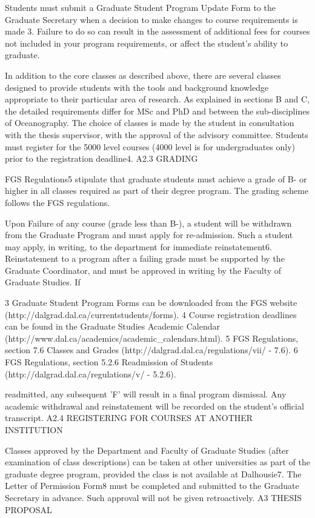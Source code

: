 Students must submit a Graduate Student Program Update Form to the Graduate Secretary when a decision to make changes to course requirements is made 3. Failure to do so can result in the assessment of additional fees for courses not included in your program requirements, or affect the student’s ability to graduate.

In addition to the core classes as described above, there are several classes designed to provide students with the tools and background knowledge appropriate to their particular area of research. As explained in sections B and C, the detailed requirements differ for MSc and PhD and between the sub-disciplines of Oceanography. The choice of classes is made by the student in consultation with the thesis supervisor, with the approval of the advisory committee. Students must register for the 5000 level
courses (4000 level is for undergraduates only) prior to the registration deadline4.
A2.3	GRADING

FGS Regulations5 stipulate that graduate students must achieve a grade of B- or higher in all classes required as part of their degree program.  The grading scheme follows the FGS regulations.

Upon Failure of any course (grade less than B-), a student will be withdrawn from the Graduate Program and must apply for re-admission. Such a student may apply, in writing, to the department for immediate reinstatement6. Reinstatement to a program after a failing grade must be supported by the Graduate Coordinator, and must be approved in writing by the Faculty of Graduate Studies. If

3 Graduate Student Program Forms can be downloaded from the FGS website (http://dalgrad.dal.ca/currentstudents/forms).
4 Course registration deadlines can be found in the Graduate Studies Academic Calendar (http://www.dal.ca/academics/academic_calendars.html).
5 FGS Regulations, section 7.6 Classes and Grades (http://dalgrad.dal.ca/regulations/vii/ - 7.6).
6 FGS Regulations, section 5.2.6 Readmission of Students (http://dalgrad.dal.ca/regulations/v/ - 5.2.6).
 

readmitted, any subsequent 'F' will result in a final program dismissal. Any academic withdrawal and reinstatement will be recorded on the student's official transcript.
A2.4	REGISTERING FOR COURSES AT ANOTHER INSTITUTION

Classes approved by the Department and Faculty of Graduate Studies (after examination of class descriptions) can be taken at other universities as part of the graduate degree program, provided the class is not available at Dalhousie7.
The Letter of Permission Form8 must be completed and submitted to the Graduate Secretary in advance. Such approval will not be given retroactively.
A3	THESIS PROPOSAL

